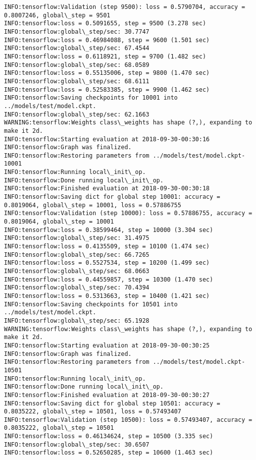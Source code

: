 \documentclass[11pt]{article}
\begin{document}
\begin{Verbatim}[commandchars=\\\{\}]
INFO:tensorflow:Validation (step 9500): loss = 0.5790704, accuracy = 0.8007246, global\_step = 9501
INFO:tensorflow:loss = 0.5091655, step = 9500 (3.278 sec)
INFO:tensorflow:global\_step/sec: 30.7747
INFO:tensorflow:loss = 0.46984088, step = 9600 (1.501 sec)
INFO:tensorflow:global\_step/sec: 67.4544
INFO:tensorflow:loss = 0.6118921, step = 9700 (1.482 sec)
INFO:tensorflow:global\_step/sec: 68.0589
INFO:tensorflow:loss = 0.55135006, step = 9800 (1.470 sec)
INFO:tensorflow:global\_step/sec: 68.6111
INFO:tensorflow:loss = 0.52583385, step = 9900 (1.462 sec)
INFO:tensorflow:Saving checkpoints for 10001 into ../models/test/model.ckpt.
INFO:tensorflow:global\_step/sec: 62.1663
WARNING:tensorflow:Weights class\_weights has shape (?,), expanding to make it 2d.
INFO:tensorflow:Starting evaluation at 2018-09-30-00:30:16
INFO:tensorflow:Graph was finalized.
INFO:tensorflow:Restoring parameters from ../models/test/model.ckpt-10001
INFO:tensorflow:Running local\_init\_op.
INFO:tensorflow:Done running local\_init\_op.
INFO:tensorflow:Finished evaluation at 2018-09-30-00:30:18
INFO:tensorflow:Saving dict for global step 10001: accuracy = 0.8019064, global\_step = 10001, loss = 0.57886755
INFO:tensorflow:Validation (step 10000): loss = 0.57886755, accuracy = 0.8019064, global\_step = 10001
INFO:tensorflow:loss = 0.38599464, step = 10000 (3.304 sec)
INFO:tensorflow:global\_step/sec: 31.4975
INFO:tensorflow:loss = 0.4135509, step = 10100 (1.474 sec)
INFO:tensorflow:global\_step/sec: 66.7265
INFO:tensorflow:loss = 0.5527534, step = 10200 (1.499 sec)
INFO:tensorflow:global\_step/sec: 68.0663
INFO:tensorflow:loss = 0.44559857, step = 10300 (1.470 sec)
INFO:tensorflow:global\_step/sec: 70.4394
INFO:tensorflow:loss = 0.5313663, step = 10400 (1.421 sec)
INFO:tensorflow:Saving checkpoints for 10501 into ../models/test/model.ckpt.
INFO:tensorflow:global\_step/sec: 65.1928
WARNING:tensorflow:Weights class\_weights has shape (?,), expanding to make it 2d.
INFO:tensorflow:Starting evaluation at 2018-09-30-00:30:25
INFO:tensorflow:Graph was finalized.
INFO:tensorflow:Restoring parameters from ../models/test/model.ckpt-10501
INFO:tensorflow:Running local\_init\_op.
INFO:tensorflow:Done running local\_init\_op.
INFO:tensorflow:Finished evaluation at 2018-09-30-00:30:27
INFO:tensorflow:Saving dict for global step 10501: accuracy = 0.8035222, global\_step = 10501, loss = 0.57493407
INFO:tensorflow:Validation (step 10500): loss = 0.57493407, accuracy = 0.8035222, global\_step = 10501
INFO:tensorflow:loss = 0.46134624, step = 10500 (3.335 sec)
INFO:tensorflow:global\_step/sec: 30.6507
INFO:tensorflow:loss = 0.52650285, step = 10600 (1.463 sec)

\end{Verbatim}
\end{document}
